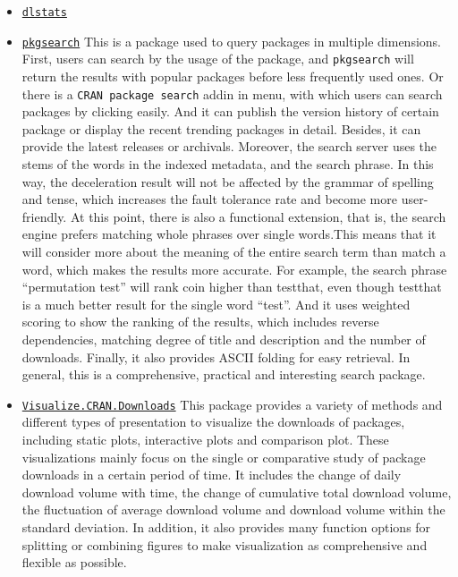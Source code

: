 \documentclass[
]{book}
\begin{document}
\begin{itemize}
\item
  \href{https://github.com/GuangchuangYu/dlstats}{\texttt{dlstats}}
\item
  \href{https://github.com/r-hub/pkgsearch/}{\texttt{pkgsearch}}
  This is a package used to query packages in multiple dimensions. First, users can search by the usage of the package, and \texttt{pkgsearch} will return the results with popular packages before less frequently used ones. Or there is a \texttt{CRAN\ package\ search} addin in menu, with which users can search packages by clicking easily. And it can publish the version history of certain package or display the recent trending packages in detail. Besides, it can provide the latest releases or archivals. Moreover, the search server uses the stems of the words in the indexed metadata, and the search phrase. In this way, the deceleration result will not be affected by the grammar of spelling and tense, which increases the fault tolerance rate and become more user-friendly. At this point, there is also a functional extension, that is, the search engine prefers matching whole phrases over single words.This means that it will consider more about the meaning of the entire search term than match a word, which makes the results more accurate. For example, the search phrase ``permutation test'' will rank coin higher than testthat, even though testthat is a much better result for the single word ``test''. And it uses weighted scoring to show the ranking of the results, which includes reverse dependencies, matching degree of title and description and the number of downloads. Finally, it also provides ASCII folding for easy retrieval. In general, this is a comprehensive, practical and interesting search package.
\item
  \href{https://cran.r-project.org/web/packages/Visualize.CRAN.Downloads/vignettes/Visualize.CRAN.Downloads.html}{\texttt{Visualize.CRAN.Downloads}}
  This package provides a variety of methods and different types of presentation to visualize the downloads of packages, including static plots, interactive plots and comparison plot. These visualizations mainly focus on the single or comparative study of package downloads in a certain period of time. It includes the change of daily download volume with time, the change of cumulative total download volume, the fluctuation of average download volume and download volume within the standard deviation. In addition, it also provides many function options for splitting or combining figures to make visualization as comprehensive and flexible as possible.
\end{itemize}
\end{document}
